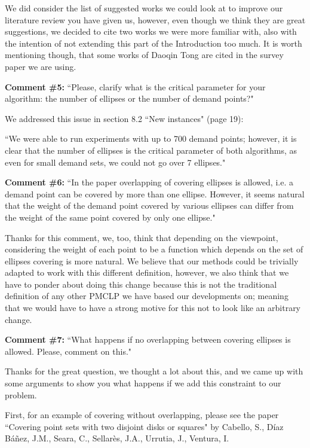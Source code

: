 	We did consider the list of suggested works we could look at to improve our literature review you have given us, however, even though we think they are great suggestions, we decided to cite two works we were more familiar with, also with the intention of not extending this part of the Introduction too much.
	It is worth mentioning though, that some works of Daoqin Tong are cited in the survey paper we are using.
	
		\textbf{Comment \#5:} ``Please, clarify what is the critical parameter for your algorithm: the number of ellipses or the number of demand points?"
		
		We addressed this issue in section 8.2 ``New instances" (page 19):
		
		``We were able to run experiments with up to 700 demand points; however, it is clear that the number of ellipses is the critical parameter of both algorithms, as even for small demand sets, we could not go over 7 ellipses."
		
		\textbf{Comment \#6:} ``In the paper overlapping of covering ellipses is allowed, i.e. a demand point can be covered by more than one ellipse. However, it seems natural that the weight of the demand point covered by various ellipses can differ from the weight of the same point covered by only one ellipse."
		
		Thanks for this comment, we, too, think that depending on the viewpoint, considering the weight of each point to be a function which depends on the set of ellipses covering is more natural. We believe that our methods could be trivially adapted to work with this different definition, however, we also think that we have to ponder about doing this change because this is not the traditional definition of any other PMCLP we have based our developments on; meaning that we would have to have a strong motive for this not to look like an arbitrary change.
			
		
		\textbf{Comment \#7:} ``What happens if no overlapping between covering ellipses is allowed. Please, comment on this."
		
		Thanks for the great question, we thought a lot about this, and we came up with some arguments to show you what happens if we add this constraint to our problem.
		
		First, for an example of covering without overlapping, please see the paper ``Covering point sets with two disjoint disks or squares" by Cabello, S., Díaz Báñez, J.M., Seara, C., Sellarès, J.A., Urrutia, J., Ventura, I.
		
